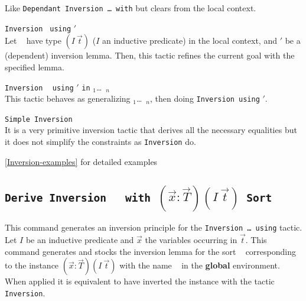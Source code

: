 \begin{Variants}
  Like \texttt{Dependant Inversion \dots\ with} but clears \ident from
  the local context.
\item \texttt{Inversion} \ident \texttt{ using} \ident$'$ \\
  Let \ident~ have type $(I~\vec{t})$ ($I$ an inductive
  predicate) in the local context, and \ident$'$ be a (dependent) inversion
  lemma. Then, this tactic refines the current goal with the specified
  lemma.
\item \texttt{Inversion} \ident~ \texttt{using} \ident$'$ 
  \texttt{in} \ident$_1$\dots\ \ident$_n$\\
  This tactic behaves as generalizing \ident$_1$\dots\ \ident$_n$,
  then doing \texttt{Inversion}\ident~\texttt{using} \ident$'$.
\item \texttt{Simple Inversion} \ident~\\
  It is a very primitive inversion tactic that derives all the necessary
  equalities  but it does not simplify the  constraints as
  \texttt{Inversion} do.
\end{Variants}

\SeeAlso \ref{Inversion-examples} for detailed examples

\subsection{\tt Derive Inversion \ident~ with
  $(\vec{x}:\vec{T})(I~\vec{t})$ Sort \sort}
\label{Derive-Inversion}

This command generates an inversion principle for the
\texttt{Inversion \dots\ using} tactic.
Let $I$ be an inductive predicate and $\vec{x}$ the variables
occurring in $\vec{t}$. This command generates and stocks the
inversion lemma for the sort \sort~ corresponding to the instance
$(\vec{x}:\vec{T})(I~\vec{t})$ with the name \ident~ in the {\bf
global} environment. When applied it is equivalent to have inverted
the instance with the tactic {\tt Inversion}.

